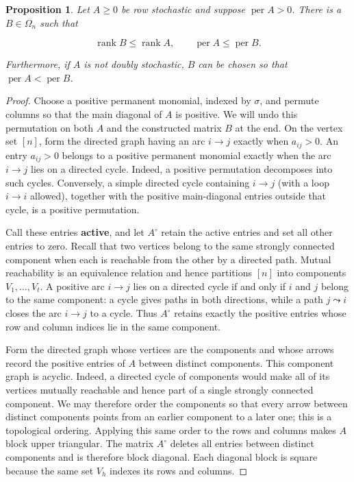 \documentclass[10pt,a4paper]{amsart}
\newtheorem{proposition}[theorem]{Proposition}
\begin{document}
\begin{proposition}
Let \(A\geq0\) be row
stochastic and suppose \(\operatorname{per}A>0\). There is a
\(B\in\Omega_n\) such that

\[
 \operatorname{rank}B\leq\operatorname{rank}A,
 \qquad
 \operatorname{per}A\leq\operatorname{per}B.               \tag{2.6}
\]

Furthermore, if \(A\) is not doubly stochastic, \(B\) can be chosen so that
\(\operatorname{per}A<\operatorname{per}B\).
\end{proposition}

\begin{proof}
Choose a positive permanent monomial, indexed by \(\sigma\), and
permute columns so that the main diagonal of \(A\) is positive. We will undo
this permutation on both \(A\) and the constructed matrix \(B\) at the end.
On the vertex set \([n]\),
form the directed graph having an arc \(i\to j\) exactly when \(a_{ij}>0\). An entry
\(a_{ij}>0\) belongs to a positive permanent monomial exactly when the arc
\(i\to j\) lies on a directed cycle. Indeed, a positive permutation
decomposes into such cycles. Conversely, a simple directed cycle containing
\(i\to j\) (with a loop \(i\to i\) allowed), together with the positive
main-diagonal entries outside that cycle, is a positive permutation.

Call these entries \textbf{active}, and let \(A^\circ\) retain the active entries
and set all other entries to zero. Recall that two vertices belong to the
same strongly connected component when each is reachable from the other by
a directed path. Mutual reachability is an equivalence relation and hence
partitions \([n]\) into components \(V_1,\ldots,V_t\). A positive arc
\(i\to j\) lies on a directed cycle if and only if \(i\) and \(j\) belong
to the same component: a cycle gives paths in both directions, while a path
\(j\leadsto i\) closes the arc \(i\to j\) to a cycle. Thus \(A^\circ\)
retains exactly the positive entries whose row and column indices lie in the
same component.

Form the directed graph whose vertices are the components and whose arrows
record the positive entries of \(A\) between distinct components. This
component graph is acyclic. Indeed, a directed cycle of components would
make all of its vertices mutually reachable and hence part of a single
strongly connected component. We may therefore order the components so that
every arrow between distinct components points from an earlier component to
a later one; this is a topological ordering. Applying this same order to the
rows and columns makes \(A\) block upper triangular. The matrix \(A^\circ\)
deletes all entries between distinct components and is therefore block
diagonal. Each diagonal block is square because the same set \(V_h\) indexes
its rows and columns.


\end{proof}
\end{document}
